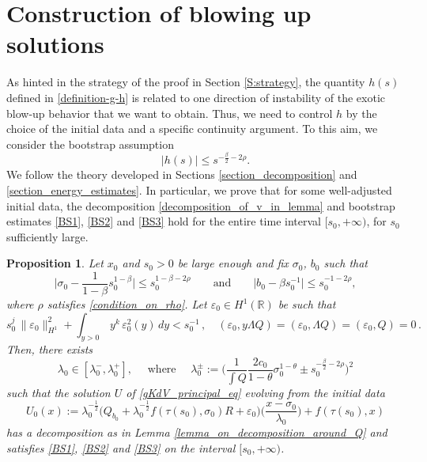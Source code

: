 \documentclass[16pt,english, oneside,reqno]{smfart}
\newcommand{\RR}{\mathbb{R}}
\newcommand{\vare}{{\varepsilon}}
\newtheorem{proposition}[theorem]{Proposition}
\begin{document}
\section{Construction of blowing up solutions}\label{section_construction}
As hinted in the strategy of the proof in Section \eqref{S:strategy},
the quantity $h(s)$ defined in \eqref{definition-g-h} is related to one
direction of instability of the exotic blow-up behavior that we want to obtain.
Thus, we need to control $h$ by the choice of the initial data
and a specific continuity argument.
To this aim, we consider the bootstrap assumption
\begin{equation}\tag{BS3}\label{BS3}
    \lvert h(s) \rvert \leq s^{-\frac{\beta}{2} - 2\rho}.
\end{equation}
We follow the theory developed in Sections \ref{section_decomposition} and \ref{section_energy_estimates}. In particular, we prove that for some well-adjusted initial data, the decomposition \eqref{decomposition_of_v_in_lemma} and bootstrap estimates \eqref{BS1}, \eqref{BS2} and \eqref{BS3} hold for the entire time interval $[s_0,+\infty)$, for $s_0$ sufficiently large.


\begin{proposition}\label{Prop_on_blow_up}
Let $x_0$ and $s_0>0$ be large enough and fix $\sigma_0$, $b_0$ such that
\begin{equation}\label{init_cond_sigma_b}
    \Big\lvert \sigma_0 - \frac{1}{1-\beta}s^{1-\beta}_0 \Big\rvert \leq s_0^{1-\beta-2\rho} \qquad \text{and} \qquad \Big\lvert b_0 - \beta s_0^{-1} \Big\rvert \leq s_0^{-1-2\rho},
\end{equation}
where $\rho $ satisfies \eqref{condition_on_rho}.
Let $\vare_0 \in H^1(\RR)$ be such that 
\begin{equation}\label{conditons_ortho_and_decroissance_on_vare_0}
s_0^{j} \, \|\varepsilon_0\|^2_{H^1} +  \int_{y>0} \, y^k \, \varepsilon^2_0(y)\, dy < s_0^{-1}\, , \quad (\varepsilon_0,y\Lambda Q) = (\varepsilon_0, \Lambda Q) = (\varepsilon_0, Q) = 0\, .
\end{equation} 
    Then, there exists 
    \begin{equation}\label{init_cond_in_BS}
        \lambda_0 \in [\lambda^-_0,\lambda^+_0], \quad \text{ where } \quad \lambda^{\pm}_0 := \Big( \frac{1}{\int Q}\frac{2 c_0}{1-\theta} \sigma^{1-\theta}_0
        \pm s^{-\frac{\beta}{2}-2\rho}_0 \Big)^2
    \end{equation}
such that the solution $U$ of \eqref{gKdV_principal_eq} evolving from the initial data
\begin{equation}
    U_0(x):= \lambda_0^{-\frac{1}{2}}\Big( Q_{b_0}+\lambda_0^{-\frac{1}{2}}f(\tau(s_0),\sigma_0)R + \vare_0 \Big)\Big( \frac{x-\sigma_0}{\lambda_0}\Big) + f(\tau(s_0),x)
\end{equation}
has a decomposition as in Lemma \ref{lemma_on_decomposition_around_Q} and satisfies \eqref{BS1}, \eqref{BS2} and \eqref{BS3} on the interval $[s_0,+\infty)$.
\end{proposition}
\end{document}
